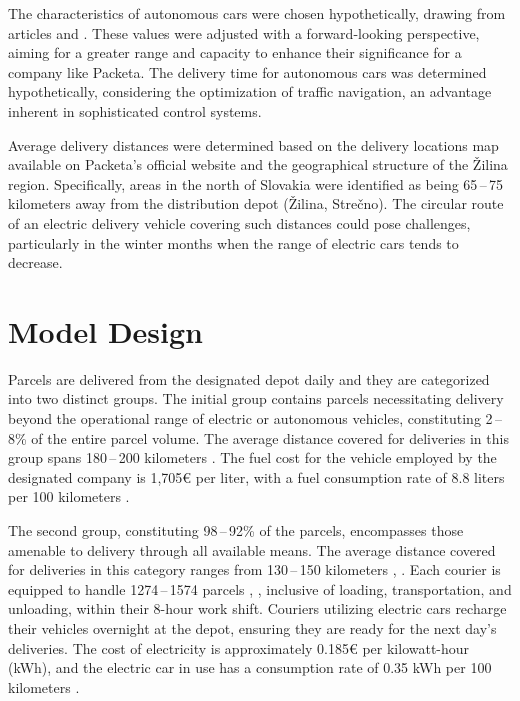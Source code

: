 \documentclass[a4paper, 11pt, a4paper]{article}
\begin{document}
The characteristics of autonomous cars were chosen hypothetically, drawing from articles \cite{autonomous.emissions} and \cite{autonomous.models}. These values were adjusted with a 
forward-looking perspective, aiming for a greater range and capacity to enhance their significance for a company like Packeta. The delivery 
time for autonomous cars was determined hypothetically, considering the optimization of traffic navigation, an advantage inherent in sophisticated 
control systems.

Average delivery distances were determined based on the delivery locations map available on Packeta's official website \cite{packeta} and the geographical 
structure of the Žilina region. Specifically, areas in the north of Slovakia were identified as being 65\,--\,75 kilometers away from the 
distribution depot (Žilina, Strečno). The circular route of an electric delivery vehicle covering such distances could pose challenges, 
particularly in the winter months when the range of electric cars tends to decrease.


\section{Model Design}

Parcels are delivered from the designated depot daily and they are categorized into two distinct groups. The initial group contains parcels 
necessitating delivery beyond the operational range of electric or autonomous vehicles, constituting 2\,--\,8\% \cite{packeta} of the entire parcel volume. 
The average distance covered for deliveries in this group spans 180\,--\,200 kilometers \cite{packeta}. The fuel cost for the vehicle employed by the designated 
company is 1,705€ per liter, with a fuel consumption rate of 8.8 liters per 100 kilometers \cite{peugeot}.

The second group, constituting 98\,--\,92\% \cite{packeta} of the parcels, encompasses those amenable to delivery through all available means. The average distance 
covered for deliveries in this category ranges from 130\,--\,150 kilometers \cite{packeta}, \cite{delivery.distance}. Each courier is equipped to handle 1274\,--\,1574 parcels \cite{parcels.num}, \cite{delivery.percentage}, inclusive of loading, 
transportation, and unloading, within their 8-hour work shift. Couriers utilizing electric cars recharge their vehicles overnight at the depot, ensuring 
they are ready for the next day's deliveries. The cost of electricity is approximately 0.185€ per kilowatt-hour (kWh), and the electric car in use has a 
consumption rate of 0.35 kWh per 100 kilometers \cite{peugeot}.
\end{document}
